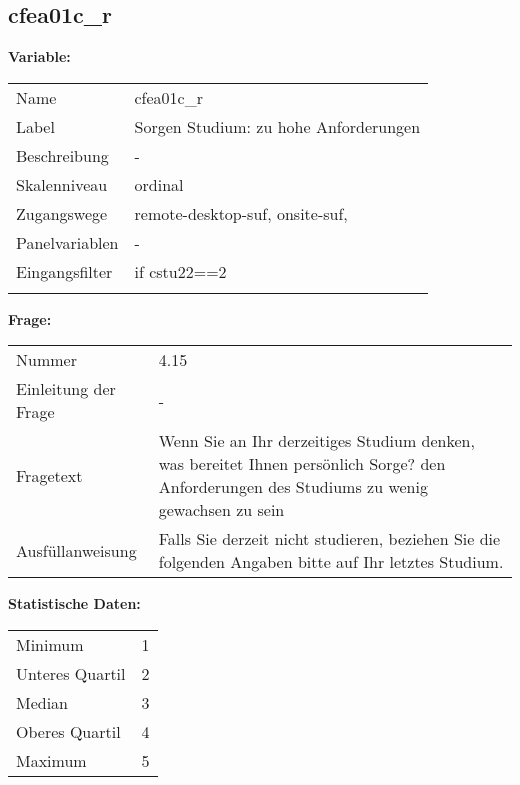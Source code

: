 	
	
	\subsection{cfea01c\_r}
	\label{subSection:cfea01c_r}

	\noindent\textbf{Variable:}\\
		\begin{tabular}{lL{11.3cm}}
			\label{tableVariable:cfea01c_r}
			Name & cfea01c\_r \\
			Label & Sorgen Studium: zu hohe Anforderungen \\
			Beschreibung & - \\
			Skalenniveau & ordinal \\
			Zugangswege &
				remote-desktop-suf,
				onsite-suf,
 \\
			Panelvariablen & -
			 \\
			Eingangsfilter & if cstu22==2 \\
 \\
		\end{tabular}

		\vspace*{1 cm}
		\noindent\textbf{Frage:}\\
		\begin{tabular}{lL{11.3cm}}
			\label{tableQuestion:cfea01c_r}
			Nummer & 4.15 \\
			Einleitung der Frage & - \\
			Fragetext & Wenn Sie an Ihr derzeitiges Studium denken, was bereitet Ihnen persönlich Sorge?
den Anforderungen des Studiums zu wenig gewachsen zu sein \\
			Ausfüllanweisung & Falls Sie derzeit nicht studieren, beziehen Sie die folgenden Angaben bitte auf Ihr letztes Studium. \\
		\end{tabular}


		\vspace*{1 cm}
		\noindent\textbf{Statistische Daten:}\\
			\begin{tabular}{ll}
				\label{tableStatistics:cfea01c_r}
					Minimum & 1 \\
					Unteres Quartil & 2 \\
					Median & 3 \\
					Oberes Quartil & 4 \\
					Maximum & 5 \\
			\end{tabular}



